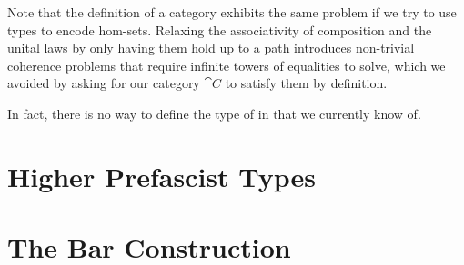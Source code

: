 Note that the definition of a category exhibits the same problem if we try to
use types to encode hom-sets. 
% 
Relaxing the associativity of composition and the unital laws by only having
them hold up to a path introduces non-trivial coherence problems that require 
infinite towers of equalities to solve, which we avoided by asking for our
category \( \cat{C} \) to satisfy them by definition.

In fact, there is no way to define the type of  in \HoTT that we currently know of. 

\section{Higher Prefascist Types}

\section{The Bar Construction}